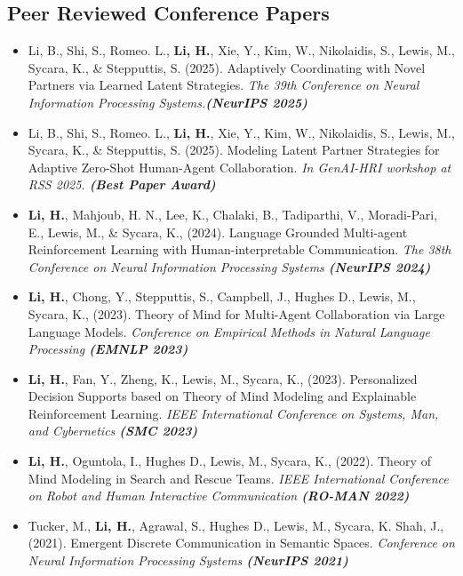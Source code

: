 \documentclass[10pt,letterpaper,roman]{moderncv}        %
\begin{document}
\subsection{Peer Reviewed Conference Papers}
\begin{itemize}
\item{ Li, B., Shi, S., Romeo. L., \textbf{Li, H.},  Xie, Y., Kim, W.,  Nikolaidis, S., Lewis, M., Sycara, K., \& Stepputtis, S. (2025). Adaptively Coordinating with Novel Partners via Learned Latent Strategies. \textit{The 39th Conference on Neural Information Processing Systems.\textbf{(NeurIPS 2025)}} }

\item{ Li, B., Shi, S., Romeo. L., \textbf{Li, H.},  Xie, Y., Kim, W.,  Nikolaidis, S., Lewis, M., Sycara, K., \& Stepputtis, S. (2025). Modeling Latent Partner Strategies for Adaptive Zero-Shot Human-Agent Collaboration. \textit{In GenAI-HRI workshop at RSS 2025. \textbf{(Best Paper Award)}} }

\item{\textbf{Li, H.}, Mahjoub, H. N., Lee, K., Chalaki, B., Tadiparthi, V.,  Moradi-Pari, E., Lewis, M., \& Sycara, K., (2024). Language Grounded Multi-agent Reinforcement Learning with Human-interpretable Communication. \textit{The 38th Conference on Neural Information Processing Systems \textbf{(NeurIPS 2024)}} }

\item{\textbf{Li, H.}, Chong, Y., Stepputtis, S., Campbell, J., Hughes D., Lewis, M., Sycara, K., (2023). Theory of Mind for Multi-Agent Collaboration via Large Language Models. \textit{Conference on Empirical Methods in Natural Language Processing \textbf{(EMNLP 2023)}}}

\item{\textbf{Li, H.},  Fan, Y., Zheng, K., Lewis, M., Sycara, K., (2023). Personalized Decision Supports based on Theory of Mind Modeling and Explainable Reinforcement Learning. \textit{IEEE International Conference on Systems, Man, and Cybernetics \textbf{(SMC 2023)}}}

\item{\textbf{Li, H.}, Oguntola, I., Hughes D., Lewis, M., Sycara, K., (2022). Theory of Mind Modeling in Search and Rescue Teams. \textit{IEEE International Conference on Robot and Human Interactive Communication \textbf{(RO-MAN 2022)}}}


\item{Tucker, M., \textbf{Li, H.}, Agrawal, S., Hughes D., Lewis, M., Sycara, K. Shah, J., (2021). Emergent Discrete Communication in Semantic Spaces. \textit{Conference on Neural Information Processing Systems \textbf{(NeurIPS 2021)}} }


\end{itemize}
\end{document}
